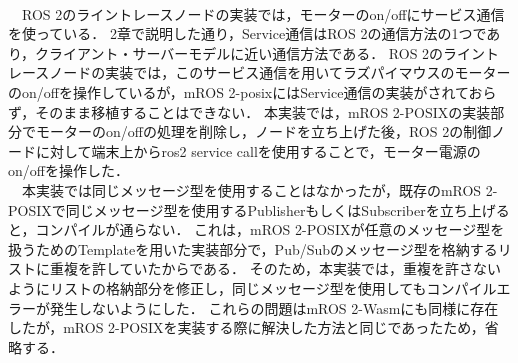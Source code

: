 \\　ROS 2のライントレースノードの実装では，モーターのon/offにサービス通信を使っている．
2章で説明した通り，Service通信はROS 2の通信方法の1つであり，クライアント・サーバーモデルに近い通信方法である．
ROS 2のライントレースノードの実装では，このサービス通信を用いてラズパイマウスのモーターのon/offを操作しているが，mROS 2-posixにはService通信の実装がされておらず，そのまま移植することはできない．
本実装では，mROS 2-POSIXの実装部分でモーターのon/offの処理を削除し，ノードを立ち上げた後，ROS 2の制御ノードに対して端末上からros2 service callを使用することで，モーター電源のon/offを操作した．
\\　本実装では同じメッセージ型を使用することはなかったが，既存のmROS 2-POSIXで同じメッセージ型を使用するPublisherもしくはSubscriberを立ち上げると，コンパイルが通らない．
これは，mROS 2-POSIXが任意のメッセージ型を扱うためのTemplateを用いた実装部分で，Pub/Subのメッセージ型を格納するリストに重複を許していたからである．
そのため，本実装では，重複を許さないようにリストの格納部分を修正し，同じメッセージ型を使用してもコンパイルエラーが発生しないようにした．
これらの問題はmROS 2-Wasmにも同様に存在したが，mROS 2-POSIXを実装する際に解決した方法と同じであったため，省略する．
